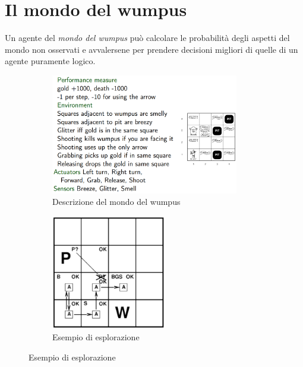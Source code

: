 \documentclass[11pt,oneside]{book}
\begin{document}
\section{Il mondo del wumpus}
Un agente del \textit{mondo del wumpus} può calcolare le probabilità degli aspetti del mondo non osservati e avvalersene per prendere decisioni migliori di quelle di un agente puramente logico.
\begin{figure}[htp]
	\begin{subfigure}{0.49\textwidth}
	    \centering
		\includegraphics[width=0.9\textwidth]{wumpus-description.png}
		\caption{Descrizione del mondo del wumpus}
	\end{subfigure}
	\hfill
	\begin{subfigure}{0.49\textwidth}
	    \centering
		\includegraphics[width=0.55\textwidth]{wumpus-exploration0.png}
		\caption{Esempio di esplorazione}
	\end{subfigure}
\end{figure}
\end{document}
